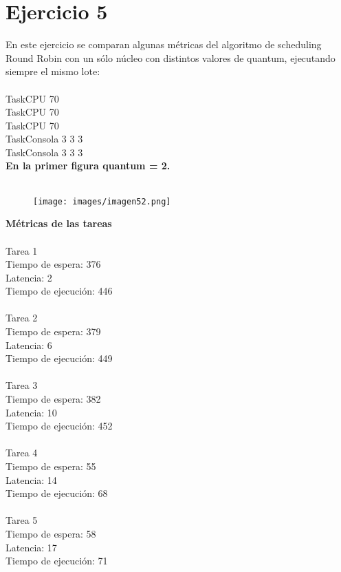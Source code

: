 \section{Ejercicio 5}
En este ejercicio se comparan algunas métricas del algoritmo de scheduling Round Robin con un sólo núcleo con distintos valores de quantum, ejecutando siempre el mismo lote:\\\\
TaskCPU 70\\
TaskCPU 70\\
TaskCPU 70\\
TaskConsola 3 3 3\\
TaskConsola 3 3 3\\

{\bf En la primer figura quantum = 2.}\\\\
\begin{figure}[h]
  \centering
    \texttt{[image: images/imagen52.png]}
  \label{fig:imagen5_2}
\end{figure}

{\bf Métricas de las tareas}\\\\
Tarea 1\\
Tiempo de espera: 376\\
Latencia: 2\\
Tiempo de ejecución: 446\\\\
Tarea 2\\
Tiempo de espera: 379\\
Latencia: 6\\
Tiempo de ejecución: 449\\\\
Tarea 3\\
Tiempo de espera: 382\\
Latencia: 10\\
Tiempo de ejecución: 452\\\\
Tarea 4\\
Tiempo de espera: 55\\
Latencia: 14\\
Tiempo de ejecución: 68\\\\
Tarea 5\\
Tiempo de espera: 58\\
Latencia: 17\\
Tiempo de ejecución: 71\\\\\\\\\\

